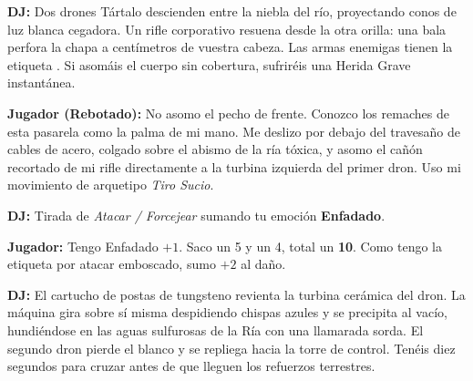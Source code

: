 \textbf{DJ:} Dos drones Tártalo descienden entre la niebla del río, proyectando conos de luz blanca cegadora. Un rifle corporativo resuena desde la otra orilla: una bala perfora la chapa a centímetros de vuestra cabeza. Las armas enemigas tienen la etiqueta . Si asomáis el cuerpo sin cobertura, sufriréis una Herida Grave instantánea.

\textbf{Jugador (Rebotado):} No asomo el pecho de frente. Conozco los remaches de esta pasarela como la palma de mi mano. Me deslizo por debajo del travesaño de cables de acero, colgado sobre el abismo de la ría tóxica, y asomo el cañón recortado de mi rifle directamente a la turbina izquierda del primer dron. Uso mi movimiento de arquetipo \textit{Tiro Sucio}.

\textbf{DJ:} Tirada de \textit{Atacar / Forcejear} sumando tu emoción \textbf{Enfadado}.

\textbf{Jugador:} Tengo Enfadado $+1$. Saco un 5 y un 4, total un \textbf{10}. Como tengo la etiqueta  por atacar emboscado, sumo $+2$ al daño.

\textbf{DJ:} El cartucho de postas de tungsteno revienta la turbina cerámica del dron. La máquina gira sobre sí misma despidiendo chispas azules y se precipita al vacío, hundiéndose en las aguas sulfurosas de la Ría con una llamarada sorda. El segundo dron pierde el blanco y se repliega hacia la torre de control. Tenéis diez segundos para cruzar antes de que lleguen los refuerzos terrestres.
